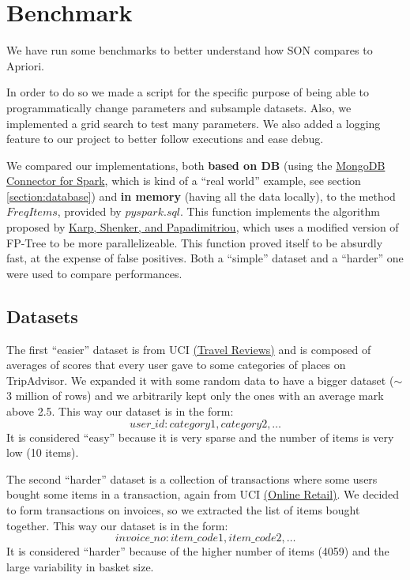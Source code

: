 \documentclass[a4paper]{article}
\begin{document}
	\section{Benchmark}
	We have run some benchmarks to better understand how SON compares to Apriori.
	
	In order to do so we made a script for the specific purpose of being able to programmatically change parameters and subsample datasets.
	Also, we implemented a grid search to test many parameters. We also added a logging feature to our project to better follow executions and ease debug.
	
	We compared our implementations, both \textbf{based on DB} (using the \href{https://www.mongodb.com/docs/spark-connector/current/}{MongoDB Connector for Spark}, which is kind of a ``real world'' example, see section \ref{section:database})
	and \textbf{in memory} (having all the data locally), to the method $FreqItems$, provided by $pyspark.sql$. 
	This function implements the algorithm proposed by \href{https://doi.org/10.1145/762471.762473}{Karp, Shenker, and Papadimitriou}, which uses a modified version of FP-Tree to be more parallelizeable. 
	This function proved itself to be absurdly fast, at the expense of false positives.
	Both a  ``simple'' dataset and a ``harder'' one were used to compare performances.

	\subsection{Datasets}
	The first ``easier'' dataset is from UCI \href{https://archive.ics.uci.edu/ml/datasets/Travel+Reviews#}{(Travel Reviews)} and is composed of averages of scores that every user gave to some
	categories of places on TripAdvisor. We expanded it with some random data to have a bigger dataset ($\sim$3 million of rows) and we arbitrarily kept only the ones with an average mark above 2.5. This way our dataset is in the form:
	\[ user\_id: category1, category2, \ldots \]
	It is considered ``easy'' because it is very sparse and the number of items is very low (10 items).

	The second ``harder'' dataset is a collection of transactions where some users bought some items in a transaction, again from UCI \href{https://archive.ics.uci.edu/ml/datasets/online+retail}{(Online Retail)}.
	We decided to form transactions on invoices, so we extracted the list of items bought together.
	This way our dataset is in the form:
	\[ invoice\_no: item\_code1, item\_code2, \ldots \]
	It is considered ``harder'' because of the higher number of items (4059) and the large variability in basket size.
\end{document}
